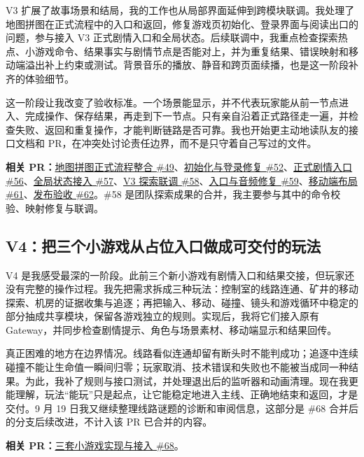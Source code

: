 V3 扩展了故事场景和结局，我的工作也从局部界面延伸到跨模块联调。我处理了地图拼图在正式流程中的入口和返回，修复游戏页初始化、登录界面与阅读出口的问题，参与接入 V3 正式剧情入口和全局状态。后续联调中，我重点检查探索热点、小游戏命令、结果事实与剧情节点是否能对上，并为重复结果、错误映射和移动端溢出补上约束或测试。背景音乐的播放、静音和跨页面续播，也是这一阶段补齐的体验细节。

这一阶段让我改变了验收标准。一个场景能显示，并不代表玩家能从前一节点进入、完成操作、保存结果，再走到下一节点。只有亲自沿着正式路径走一遍，并检查失败、返回和重复操作，才能判断链路是否可靠。我也开始更主动地读队友的接口文档和 PR，在冲突处讨论责任边界，而不是只守着自己写过的文件。

\textbf{相关 PR：}\href{https://github.com/214notfound/jiedeng/pull/49}{地图拼图正式流程整合 \#49}、\href{https://github.com/214notfound/jiedeng/pull/52}{初始化与登录修复 \#52}、\href{https://github.com/214notfound/jiedeng/pull/56}{正式剧情入口 \#56}、\href{https://github.com/214notfound/jiedeng/pull/57}{全局状态接入 \#57}、\href{https://github.com/214notfound/jiedeng/pull/58}{V3 探索联调 \#58}、\href{https://github.com/214notfound/jiedeng/pull/59}{入口与音频修复 \#59}、\href{https://github.com/214notfound/jiedeng/pull/61}{移动端布局 \#61}、\href{https://github.com/214notfound/jiedeng/pull/62}{发布验收 \#62}。\#58 是团队探索成果的合并，我主要参与其中的命令校验、映射修复与联调。

\subsection{V4：把三个小游戏从占位入口做成可交付的玩法}

V4 是我感受最深的一阶段。此前三个新小游戏有剧情入口和结果交接，但玩家还没有完整的操作过程。我先把需求拆成三种玩法：控制室的线路连通、矿井的移动探索、机房的证据收集与追逐；再把输入、移动、碰撞、镜头和游戏循环中稳定的部分抽成共享模块，保留各游戏独立的规则。实现后，我将它们接入原有 Gateway，并同步检查剧情提示、角色与场景素材、移动端显示和结果回传。

真正困难的地方在边界情况。线路看似连通却留有断头时不能判成功；追逐中连续碰撞不能让生命值一瞬间归零；玩家取消、技术错误和失败也不能被当成同一种结果。为此，我补了规则与接口测试，并处理退出后的监听器和动画清理。现在我更能理解，玩法“能玩”只是起点，让它能稳定地进入主线、正确地结束和返回，才是交付。9 月 19 日我又继续整理线路谜题的诊断和审阅信息，这部分是 \#68 合并后的分支后续改进，不计入该 PR 已合并的内容。

\textbf{相关 PR：}\href{https://github.com/214notfound/jiedeng/pull/68}{三套小游戏实现与接入 \#68}。

